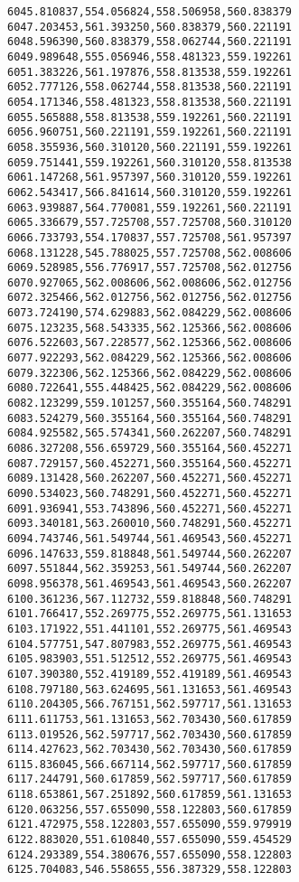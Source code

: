 \documentclass[11pt]{article}
\begin{document}
\begin{Verbatim}[commandchars=\\\{\}]
6045.810837,554.056824,558.506958,560.838379
6047.203453,561.393250,560.838379,560.221191
6048.596390,560.838379,558.062744,560.221191
6049.989648,555.056946,558.481323,559.192261
6051.383226,561.197876,558.813538,559.192261
6052.777126,558.062744,558.813538,560.221191
6054.171346,558.481323,558.813538,560.221191
6055.565888,558.813538,559.192261,560.221191
6056.960751,560.221191,559.192261,560.221191
6058.355936,560.310120,560.221191,559.192261
6059.751441,559.192261,560.310120,558.813538
6061.147268,561.957397,560.310120,559.192261
6062.543417,566.841614,560.310120,559.192261
6063.939887,564.770081,559.192261,560.221191
6065.336679,557.725708,557.725708,560.310120
6066.733793,554.170837,557.725708,561.957397
6068.131228,545.788025,557.725708,562.008606
6069.528985,556.776917,557.725708,562.012756
6070.927065,562.008606,562.008606,562.012756
6072.325466,562.012756,562.012756,562.012756
6073.724190,574.629883,562.084229,562.008606
6075.123235,568.543335,562.125366,562.008606
6076.522603,567.228577,562.125366,562.008606
6077.922293,562.084229,562.125366,562.008606
6079.322306,562.125366,562.084229,562.008606
6080.722641,555.448425,562.084229,562.008606
6082.123299,559.101257,560.355164,560.748291
6083.524279,560.355164,560.355164,560.748291
6084.925582,565.574341,560.262207,560.748291
6086.327208,556.659729,560.355164,560.452271
6087.729157,560.452271,560.355164,560.452271
6089.131428,560.262207,560.452271,560.452271
6090.534023,560.748291,560.452271,560.452271
6091.936941,553.743896,560.452271,560.452271
6093.340181,563.260010,560.748291,560.452271
6094.743746,561.549744,561.469543,560.452271
6096.147633,559.818848,561.549744,560.262207
6097.551844,562.359253,561.549744,560.262207
6098.956378,561.469543,561.469543,560.262207
6100.361236,567.112732,559.818848,560.748291
6101.766417,552.269775,552.269775,561.131653
6103.171922,551.441101,552.269775,561.469543
6104.577751,547.807983,552.269775,561.469543
6105.983903,551.512512,552.269775,561.469543
6107.390380,552.419189,552.419189,561.469543
6108.797180,563.624695,561.131653,561.469543
6110.204305,566.767151,562.597717,561.131653
6111.611753,561.131653,562.703430,560.617859
6113.019526,562.597717,562.703430,560.617859
6114.427623,562.703430,562.703430,560.617859
6115.836045,566.667114,562.597717,560.617859
6117.244791,560.617859,562.597717,560.617859
6118.653861,567.251892,560.617859,561.131653
6120.063256,557.655090,558.122803,560.617859
6121.472975,558.122803,557.655090,559.979919
6122.883020,551.610840,557.655090,559.454529
6124.293389,554.380676,557.655090,558.122803
6125.704083,546.558655,556.387329,558.122803

\end{Verbatim}
\end{document}
